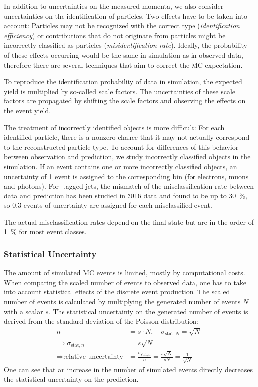 In addition to uncertainties on the measured momenta, we also consider uncertainties on the identification of particles. Two effects have to be taken into account: Particles may not be recognized with the correct type (\emph{identification efficiency}) or contributions that do not originate from particles might be incorrectly classified as particles (\emph{misidentification rate}). Ideally, the probability of these effects occurring would be the same in simulation as in observed data, therefore there are several techniques that aim to correct the \ac{MC} expectation.

To reproduce the identification probability of data in simulation, the expected yield is multiplied by so-called scale factors. The uncertainties of these scale factors are propagated by shifting the scale factors and observing the effects on the event yield.

The treatment of incorrectly identified objects is more difficult: For each identified particle, there is a nonzero chance that it may not actually correspond to the reconstructed particle type. To account for differences of this behavior between observation and prediction, we study incorrectly classified objects in the simulation. If an event contains one or more incorrectly classified objects, an uncertainty of \num{1} event is assigned to the corresponding bin (for electrons, muons and photons)\cite{Roemer:ModelUnspecificSearch}. 
For \Pqb-tagged jets, the mismatch of the misclassification rate between data and prediction has been studied in 2016 data and found to be up to \SI{30}{\percent}\cite[Fig. 73]{CMS:CMS-AN-2017-018}, so \num{0.3} events of uncertainty are assigned for each misclassified event. 

The actual misclassification rates depend on the final state but are in the order of \SI{1}{\percent} for most event classes.

\subsubsection{Statistical Uncertainty}
The amount of simulated \ac{MC} events is limited, mostly by computational costs. When comparing the scaled number of events to observed data, one has to take into account statistical effects of the discrete event production. The scaled number of events is calculated by multiplying the generated number of events $N$ with a scalar $s$. The statistical uncertainty on the generated number of events is derived from the standard deviation of the Poisson distribution: 
\begin{align}
    n &= s \cdot N, \quad \sigma_{\text{stat}, N} = \sqrt{N} \\
    \Rightarrow \sigma_{\text{stat}, n} &= s \sqrt{N} \\
    \Rightarrow \text{relative uncertainty} &= \frac{\sigma_{\text{stat}, n}}{n} = \frac{s \sqrt{N}}{s N} = \frac{1}{\sqrt{N}}
\end{align}
One can see that an increase in the number of simulated events directly decreases the statistical uncertainty on the prediction.

